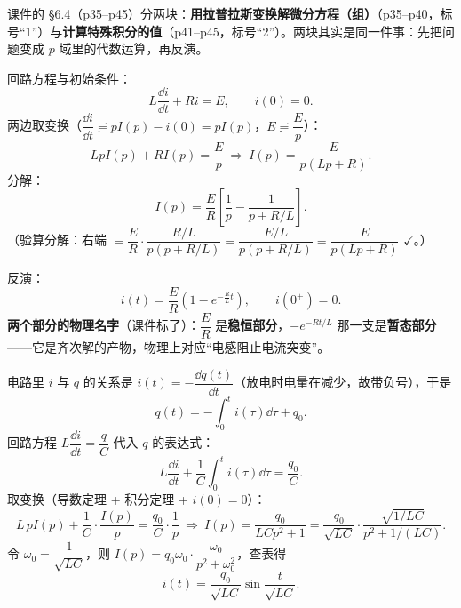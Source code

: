 \documentclass[11pt]{ctexart}
\begin{document}
课件的 §6.4（p35--p45）分两块：\textbf{用拉普拉斯变换解微分方程（组）}（p35--p40，标号“1”）与\textbf{计算特殊积分的值}（p41--p45，标号“2”）。两块其实是同一件事：先把问题变成 $p$ 域里的代数运算，再反演。


回路方程与初始条件：
\[ L\frac{\dd i}{\dd t}+Ri=E,\qquad i(0)=0 .\]
两边取变换（$\dfrac{\dd i}{\dd t}\risingdotseq pI(p)-i(0)=pI(p)$，$E\risingdotseq\dfrac{E}{p}$）：
\[ LpI(p)+RI(p)=\frac{E}{p}\ \Longrightarrow\ I(p)=\frac{E}{p(Lp+R)} .\]
分解：
\[ I(p)=\frac{E}{R}\left[\frac{1}{p}-\frac{1}{p+R/L}\right].\]
（验算分解：右端 $=\dfrac{E}{R}\cdot\dfrac{R/L}{p(p+R/L)}=\dfrac{E/L}{p(p+R/L)}=\dfrac{E}{p(Lp+R)}$ $\checkmark$。）

反演：
\[ i(t)=\frac{E}{R}\left(1-e^{-\frac{R}{L}t}\right),\qquad i(0^{+})=0 .\]
\textbf{两个部分的物理名字}（课件标了）：$\dfrac{E}{R}$ 是\textbf{稳恒部分}，$-e^{-Rt/L}$ 那一支是\textbf{暂态部分}——它是齐次解的产物，物理上对应“电感阻止电流突变”。


电路里 $i$ 与 $q$ 的关系是 $i(t)=-\dfrac{\dd q(t)}{\dd t}$（放电时电量在减少，故带负号），于是
\[ q(t)=-\int_0^{t}i(\tau)\dd\tau+q_0 .\]
回路方程 $L\dfrac{\dd i}{\dd t}=\dfrac{q}{C}$ 代入 $q$ 的表达式：
\[ L\frac{\dd i}{\dd t}+\frac{1}{C}\int_0^{t}i(\tau)\dd\tau=\frac{q_0}{C} .\]
取变换（导数定理 + 积分定理 + $i(0)=0$）：
\[ L\,pI(p)+\frac{1}{C}\cdot\frac{I(p)}{p}=\frac{q_0}{C}\cdot\frac{1}{p}\ \Longrightarrow\
I(p)=\frac{q_0}{LCp^{2}+1}=\frac{q_0}{\sqrt{LC}}\cdot\frac{\sqrt{1/LC}}{p^{2}+1/(LC)} .\]
令 $\omega_0=\dfrac{1}{\sqrt{LC}}$，则 $I(p)=q_0\omega_0\cdot\dfrac{\omega_0}{p^{2}+\omega_0^{2}}$，查表得
\[ i(t)=\frac{q_0}{\sqrt{LC}}\sin\frac{t}{\sqrt{LC}} .\]


\end{document}
